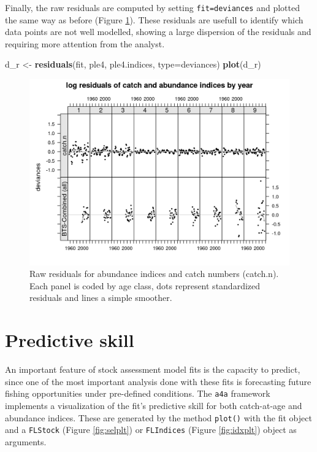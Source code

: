 \documentclass[
]{book}
\newenvironment{Shaded}{\begin{snugshade}}{\end{snugshade}}
\newcommand{\AttributeTok}[1]{\textcolor[rgb]{0.13,0.29,0.53}{#1}}
\newcommand{\FunctionTok}[1]{\textcolor[rgb]{0.13,0.29,0.53}{\textbf{#1}}}
\newcommand{\NormalTok}[1]{#1}
\newcommand{\OtherTok}[1]{\textcolor[rgb]{0.56,0.35,0.01}{#1}}
\newcommand{\StringTok}[1]{\textcolor[rgb]{0.31,0.60,0.02}{#1}}
\begin{document}
Finally, the raw residuals are computed by setting \texttt{fit=\textquotesingle{}deviances\textquotesingle{}} and plotted the same way as before (Figure \ref{fig:resr}). These residuals are usefull to identify which data points are not well modelled, showing a large dispersion of the residuals and requiring more attention from the analyst.

\begin{Shaded}
\begin{Highlighting}[]
\NormalTok{d\_r }\OtherTok{\textless{}{-}} \FunctionTok{residuals}\NormalTok{(fit, ple4, ple4.indices, }\AttributeTok{type=}\StringTok{\textquotesingle{}deviances\textquotesingle{}}\NormalTok{)}
\FunctionTok{plot}\NormalTok{(d\_r)}
\end{Highlighting}
\end{Shaded}

\begin{figure}
\centering
\includegraphics{_bookdown_files/_main_files/figure-html/resr-1.png}
\caption{\label{fig:resr}Raw residuals for abundance indices and catch numbers (catch.n). Each panel is coded by age class, dots represent standardized residuals and lines a simple smoother.}
\end{figure}

\hypertarget{predictive-skill}{%
\section{Predictive skill}\label{predictive-skill}}

An important feature of stock assessment model fits is the capacity to predict, since one of the most important analysis done with these fits is forecasting future fishing opportunities under pre-defined conditions. The \texttt{a4a} framework implements a visualization of the fit's predictive skill for both catch-at-age and abundance indices. These are generated by the method \texttt{plot()} with the fit object and a \texttt{FLStock} (Figure \ref{fig:selplt}) or \texttt{FLIndices} (Figure \ref{fig:idxplt}) object as arguments.
\end{document}
